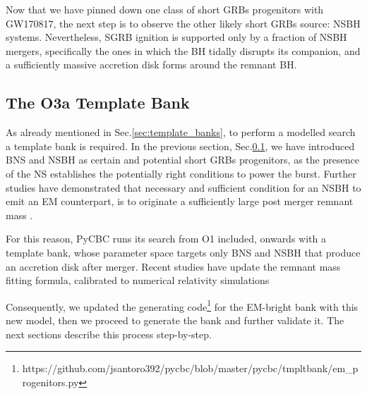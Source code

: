 \documentclass[binding=0.6cm, LaM]{sapthesis}
\begin{document}
	Now that we have pinned down one class of short GRBs progenitors with GW170817, 
	the next step is to observe the other likely short GRBs source: NSBH systems.
	Nevertheless, SGRB ignition is supported only by a fraction of NSBH mergers,
	specifically the ones in which the BH tidally disrupts its companion, 
	and a sufficiently massive accretion disk forms around the remnant BH.

\subsection{The O3a Template Bank}
	As already mentioned in Sec.\ref{sec:template_banks}, to perform a modelled search 
	a template bank is required. 
	In the previous section, Sec.\ref{}, we have introduced BNS and NSBH as certain and potential short GRBs progenitors,
	as the presence of the NS establishes the potentially right conditions to power the burst.
	Further studies have demonstrated that necessary and sufficient condition for an NSBH to emit an EM counterpart,
	is to originate a sufficiently large post merger remnant mass \cite{}.
	
	For this reason, {\ttfamily PyCBC} runs its search from O1 included,  onwards with a template bank,
	whose parameter space  targets only BNS and NSBH that produce an accretion disk after merger.
	Recent studies have update the remnant mass fitting formula, 	
	calibrated to numerical relativity  simulations \cite{}
	
	Consequently, we updated the generating code\footnote{https://github.com/jsantoro392/pycbc/blob/master/pycbc/tmpltbank/em\_progenitors.py}
	for the EM-bright bank with this new model, then we proceed to generate the bank and further validate it.
	The next sections describe this process step-by-step.
\end{document}
